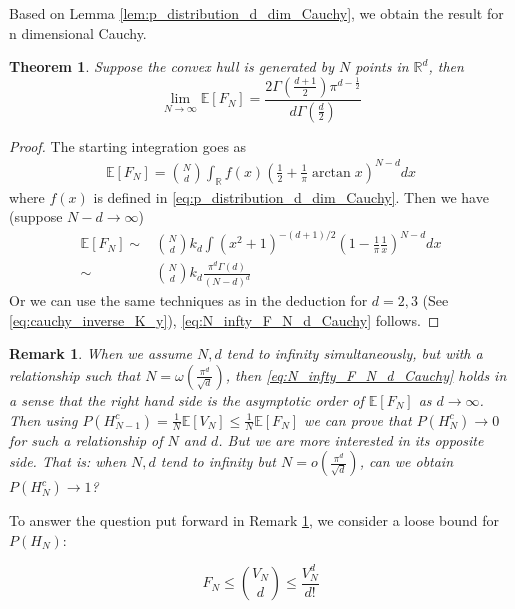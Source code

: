 \documentclass{article}
\newtheorem{theorem}{Theorem}
\newtheorem{remark}{Remark}
\def\E{\mathbb{E}}
\def\R{\mathbb{R}}
\begin{document}
Based on
Lemma \ref{lem:p_distribution_d_dim_Cauchy},
we obtain the result
for n dimensional Cauchy.
\begin{theorem}
    Suppose the convex hull is generated by $N$ points in $\R^d$,
    then
\begin{equation}\label{eq:N_infty_F_N_d_Cauchy}
    \lim_{N\to \infty} \E[F_N]
    = \frac{2 \Gamma(\frac{d+1}{2})\pi^{d-\frac{1}{2}}}{d \Gamma(\frac{d}{2})}
\end{equation}
\end{theorem}
\begin{proof}
    The starting integration goes as
    \begin{align}
        \E[F_N]=\binom{N}{d} \int_{\R}
        f(x)(\frac{1}{2} + \frac{1}{\pi}
        \arctan x)^{N-d} dx
    \end{align}
    where $f(x)$ is defined in
    \eqref{eq:p_distribution_d_dim_Cauchy}.
    Then we have (suppose $N-d \to \infty$)
    \begin{align*}
        \E[F_N] \sim & \binom{N}{d} k_d \int
        (x^2+1)^{-(d+1)/2}
        \left(
        1-\frac{1}{\pi} \frac{1}{x}\right)^{N-d} dx \\
        \sim & \binom{N}{d} k_d \frac{\pi^d \Gamma(d)}
        {(N-d)^d}
    \end{align*}
    Or we can use the same techniques as in the deduction for $d=2,3$
    (See \eqref{eq:cauchy_inverse_K_y}), \eqref{eq:N_infty_F_N_d_Cauchy} follows.
\end{proof}
\begin{remark}\label{rem:phase_transition}
    When we assume $N,d$ tend to infinity simultaneously,
    but with a relationship such that $N = \omega(\frac{\pi^d}{\sqrt{d}})$,
    then \eqref{eq:N_infty_F_N_d_Cauchy} holds in a sense that
    the right hand side is the asymptotic order of $\E[F_N]$
    as $d\to \infty$.
    Then using $P(H_{N-1}^c) = \frac{1}{N}\E[V_N] \leq \frac{1}{N}\E[F_N]$
    we can prove that $P(H_{N}^c) \to 0$ for such a relationship of $N$ and $d$.
    But we are more interested in its opposite side. That is:
    when $N,d$ tend to infinity but $N = o(\frac{\pi^d}{\sqrt{d}})$,
    can we obtain $P(H_{N}^c) \to 1$?
\end{remark}
To answer the question put forward in
Remark \ref{rem:phase_transition},
we consider a loose bound for $P(H_N)$:

\begin{equation}
    F_N \leq \binom{V_N}{d} \leq \frac{V^d_N}{d!}
\end{equation}
\end{document}
